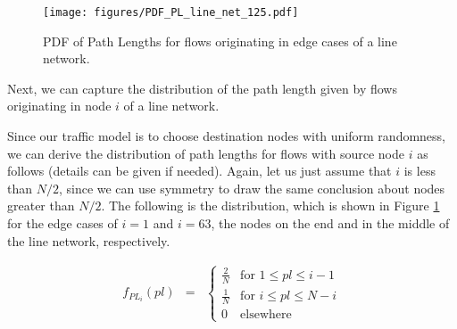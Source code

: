 \begin{figure}
\begin{centering}
    \texttt{[image: figures/PDF\_PL\_line\_net\_125.pdf]}
    \caption{PDF of Path Lengths for flows originating in edge cases of a line network.}
    \label{fig:PL_PDFs_line_net}
\end{centering}
\end{figure}

Next, we can capture the distribution of the path length given by flows originating in node $i$ of a line network.

Since our traffic model is to choose destination nodes with uniform randomness, we can derive the distribution of path lengths for flows with source node $i$ as follows (details can be given if needed).  Again, let us just assume that $i$ is less than $N/2$, since we can use symmetry to draw the same conclusion about nodes greater than $N/2$.  The following is the distribution, which is shown in Figure \ref{fig:PL_PDFs_line_net} for the edge cases of $i=1$ and $i=63$, the nodes on the end and in the middle of the line network, respectively. 

\begin{eqnarray}
	f_{PL_i}(pl) &=&
		\left\{\begin{array}{ll}
		\frac{2}{N} & \mbox{for } 1 \leq pl \leq i-1 \\
		\frac{1}{N} & \mbox{for } i \leq pl \leq N-i \\
		0 &\mbox{elsewhere}
		\end{array}\right.
\label{eq:full_PDF_PL}
\end{eqnarray}

